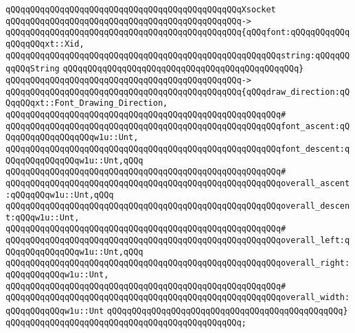 \verb|qQQqqQQqqQQqqQQqqQQqqQQqqQQqqQQqqQQqqQQqqQQqqQQqXsocket|\newline
\verb|qQQqqQQqqQQqqQQqqQQqqQQqqQQqqQQqqQQqqQQqqQQqqQQq->|\newline
\verb|qQQqqQQqqQQqqQQqqQQqqQQqqQQqqQQqqQQqqQQqqQQqqQQq{qQQqfont:qQQqqQQqqQQqqQQqqQQqxt::Xid,|\newline
\verb|qQQqqQQqqQQqqQQqqQQqqQQqqQQqqQQqqQQqqQQqqQQqqQQqqQQqqQQqstring:qQQqqQQqqQQqString|\newline
\verb|qQQqqQQqqQQqqQQqqQQqqQQqqQQqqQQqqQQqqQQqqQQqqQQq}|\newline
\verb|qQQqqQQqqQQqqQQqqQQqqQQqqQQqqQQqqQQqqQQqqQQqqQQq->|\newline
\verb|qQQqqQQqqQQqqQQqqQQqqQQqqQQqqQQqqQQqqQQqqQQqqQQq{qQQqdraw_direction:qQQqqQQqxt::Font_Drawing_Direction,|\newline
\verb|qQQqqQQqqQQqqQQqqQQqqQQqqQQqqQQqqQQqqQQqqQQqqQQqqQQqqQQq#|\newline
\verb|qQQqqQQqqQQqqQQqqQQqqQQqqQQqqQQqqQQqqQQqqQQqqQQqqQQqqQQqfont_ascent:qQQqqQQqqQQqqQQqqQQqw1u::Unt,|\newline
\verb|qQQqqQQqqQQqqQQqqQQqqQQqqQQqqQQqqQQqqQQqqQQqqQQqqQQqqQQqfont_descent:qQQqqQQqqQQqqQQqw1u::Unt,qQQq|\newline
\verb|qQQqqQQqqQQqqQQqqQQqqQQqqQQqqQQqqQQqqQQqqQQqqQQqqQQqqQQq#|\newline
\verb|qQQqqQQqqQQqqQQqqQQqqQQqqQQqqQQqqQQqqQQqqQQqqQQqqQQqqQQqoverall_ascent:qQQqqQQqw1u::Unt,qQQq|\newline
\verb|qQQqqQQqqQQqqQQqqQQqqQQqqQQqqQQqqQQqqQQqqQQqqQQqqQQqqQQqoverall_descent:qQQqw1u::Unt,|\newline
\verb|qQQqqQQqqQQqqQQqqQQqqQQqqQQqqQQqqQQqqQQqqQQqqQQqqQQqqQQq#|\newline
\verb|qQQqqQQqqQQqqQQqqQQqqQQqqQQqqQQqqQQqqQQqqQQqqQQqqQQqqQQqoverall_left:qQQqqQQqqQQqqQQqw1u::Unt,qQQq|\newline
\verb|qQQqqQQqqQQqqQQqqQQqqQQqqQQqqQQqqQQqqQQqqQQqqQQqqQQqqQQqoverall_right:qQQqqQQqqQQqw1u::Unt,|\newline
\verb|qQQqqQQqqQQqqQQqqQQqqQQqqQQqqQQqqQQqqQQqqQQqqQQqqQQqqQQq#|\newline
\verb|qQQqqQQqqQQqqQQqqQQqqQQqqQQqqQQqqQQqqQQqqQQqqQQqqQQqqQQqoverall_width:qQQqqQQqqQQqw1u::Unt|\newline
\verb|qQQqqQQqqQQqqQQqqQQqqQQqqQQqqQQqqQQqqQQqqQQqqQQq}|\newline
\verb|qQQqqQQqqQQqqQQqqQQqqQQqqQQqqQQqqQQqqQQqqQQqqQQq;|\newline
\newline
